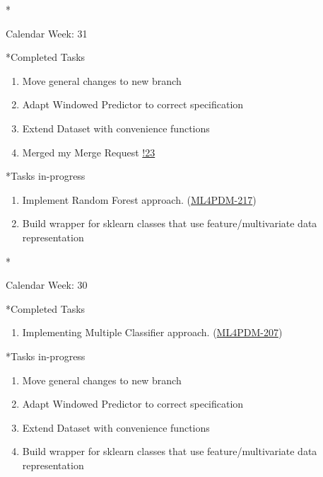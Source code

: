 \documentclass[11pt,a4paper]{article}
\begin{document}
\newpage
\begin{section}*{Calendar Week: 31 \hfill \date{06 August, 2021}}
 \begin{refsection}
   \begin{subsection}*{Completed Tasks}
     \begin{enumerate}
       \item
             Move general changes to new branch
       \item
             Adapt Windowed Predictor to correct specification
       \item
             Extend Dataset with convenience functions
       \item
             Merged my Merge Request \href{https://git.cs.uni-paderborn.de/machine-learning-for-predictive-maintenance/code/-/merge_requests/23}{!23}
     \end{enumerate}
   \end{subsection}
   \begin{subsection}*{Tasks in-progress}
     \begin{enumerate}
       \item
             Implement Random Forest approach. (\href{https://ml4pdm.atlassian.net/browse/ML4PDM-217}{ML4PDM-217})
       \item
             Build wrapper for sklearn classes that use feature/multivariate data representation
     \end{enumerate}
   \end{subsection}
 \end{refsection}
\end{section}

\newpage
\begin{section}*{Calendar Week: 30 \hfill \date{30 July, 2021}}
 \begin{refsection}
   \begin{subsection}*{Completed Tasks}
     \begin{enumerate}
       \item
             Implementing Multiple Classifier approach. (\href{https://ml4pdm.atlassian.net/browse/ML4PDM-207}{ML4PDM-207})
     \end{enumerate}
   \end{subsection}
   \begin{subsection}*{Tasks in-progress}
     \begin{enumerate}
       \item
             Move general changes to new branch
       \item
             Adapt Windowed Predictor to correct specification
       \item
             Extend Dataset with convenience functions
       \item
             Build wrapper for sklearn classes that use feature/multivariate data representation
     \end{enumerate}
   \end{subsection}
 \end{refsection}
\end{section}
\end{document}
